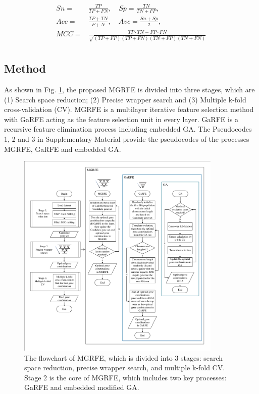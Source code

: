 \documentclass[10pt,journal,compsoc]{IEEEtran}
\begin{document}
	{\scriptsize
		\begin{equation}\label{eq:1}
		\begin{split}
		Sn = & \frac{TP}{TP+FN} ,\quad Sp = \frac{TN}{TN+FP}, \\
		Acc = & \frac{TP+TN}{P+N} ,\quad Avc = \frac{Sn+Sp}{2}, \\
		MCC = & \frac{TP \cdot TN-FP \cdot FN}{\sqrt{(TP+FP)(TP+FN)(TN+FP)(TN+FN)}}\\
		\end{split}
		\end{equation}
	}
	
	\subsection{Method}
	
	As shown in Fig. \ref {Fig:MGRFE_flowchart}, the proposed MGRFE is divided into three stages, which are (1) Search space reduction; (2) Precise wrapper search and (3) Multiple k-fold cross-validation (CV). MGRFE is a multilayer iterative feature selection method with GaRFE acting as the feature selection unit in every layer. GaRFE is a recursive feature elimination process including embedded GA. The Pseudocodes 1, 2 and 3 in Supplementary Material provide the pseudocodes of the processes MGRFE, GaRFE and embedded GA.
	
	\begin{figure}[t]
		\centering
		\includegraphics[width=0.87\textwidth]{pictures/MGRFE-flowchart.pdf}
		\caption{The flowchart of MGRFE, which is divided into 3 stages: search space reduction, precise wrapper search, and multiple k-fold CV. Stage 2 is the core of MGRFE, which includes two key processes: GaRFE and embedded modified GA.}
		\label{Fig:MGRFE_flowchart}
	\end{figure}
	
\end{document}

